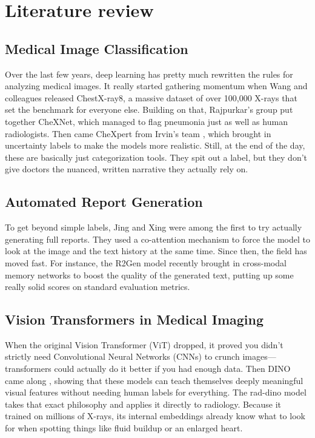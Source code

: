 \documentclass[conference]{IEEEtran}
\begin{document}
\section{Literature review}

\subsection{Medical Image Classification}
Over the last few years, deep learning has pretty much rewritten the rules for analyzing medical images. It really started gathering momentum when Wang and colleagues \cite{wang2017chestxray8} released ChestX-ray8, a massive dataset of over 100,000 X-rays that set the benchmark for everyone else. Building on that, Rajpurkar's group \cite{rajpurkar2017chexnet} put together CheXNet, which managed to flag pneumonia just as well as human radiologists. Then came CheXpert from Irvin's team \cite{irvin2019chexpert}, which brought in uncertainty labels to make the models more realistic. Still, at the end of the day, these are basically just categorization tools. They spit out a label, but they don't give doctors the nuanced, written narrative they actually rely on.

\subsection{Automated Report Generation}
To get beyond simple labels, Jing and Xing \cite{jing2018automatic} were among the first to try actually generating full reports. They used a co-attention mechanism to force the model to look at the image and the text history at the same time. Since then, the field has moved fast. For instance, the R2Gen model \cite{chen2022r2gen} recently brought in cross-modal memory networks to boost the quality of the generated text, putting up some really solid scores on standard evaluation metrics.

\subsection{Vision Transformers in Medical Imaging}
When the original Vision Transformer (ViT) \cite{dosovitskiy2020image} dropped, it proved you didn't strictly need Convolutional Neural Networks (CNNs) to crunch images—transformers could actually do it better if you had enough data. Then DINO came along \cite{caron2021emerging}, showing that these models can teach themselves deeply meaningful visual features without needing human labels for everything. The rad-dino model takes that exact philosophy and applies it directly to radiology. Because it trained on millions of X-rays, its internal embeddings already know what to look for when spotting things like fluid buildup or an enlarged heart.
\end{document}
